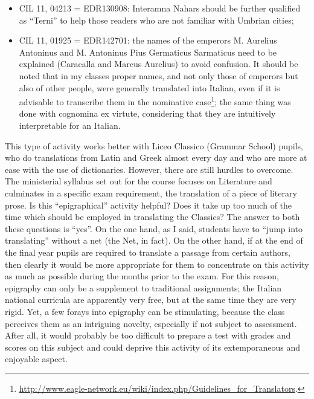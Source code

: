 \documentclass[amsthm,ebook]{saparticle}
\begin{document}
\begin{itemize}
\item  CIL 11, 04213 = EDR130908: Interamna Nahars should be further qualified as ``Terni'' to
help those readers who are not familiar with Umbrian cities;

\item CIL 11, 01925 = EDR142701: the names of the emperors M. Aurelius Antoninus and M.
Antoninus Pius Germaticus Sarmaticus need to be explained (Caracalla and Marcus Aurelius) to avoid confusion. It should
be noted that in my classes proper names, and not only those of emperors but also of other people, were generally
translated into Italian, even if it is advisable to transcribe them in the nominative case\footnote{
\url{http://www.eagle-network.eu/wiki/index.php/Guidelines\_for\_Translators}.}; the same thing was done with cognomina ex
virtute, considering that they are intuitively interpretable for an Italian.
\end{itemize}





This type of activity works better with Liceo Classico (Grammar School) pupils, who do translations from Latin and Greek
almost every day and who are more at ease with the use of dictionaries. However, there are still hurdles to overcome.
The ministerial syllabus set out for the course focuses on Literature and culminates in a specific exam requirement,
the translation of a piece of literary prose. Is this ``epigraphical'' activity helpful? Does it take up too much of the
time which should be employed in translating the Classics? The answer to both these questions is ``yes''. On the one
hand, as I said, students have to ``jump into translating'' without a net (the Net, in fact). On the other hand, if at
the end of the final year pupils are required to translate a passage from certain authors, then clearly it would be
more appropriate for them to concentrate on this activity as much as possible during the months prior to the exam. For
this reason, epigraphy can only be a supplement to traditional assignments; the Italian national curricula are
apparently very free, but at the same time they are very rigid. Yet, a few forays into epigraphy can be stimulating,
because the class perceives them as an intriguing novelty, especially if not subject to assessment. After all, it would
probably be too difficult to prepare a test with grades and scores on this subject and could deprive this activity of
its extemporaneous and enjoyable aspect.
\end{document}
